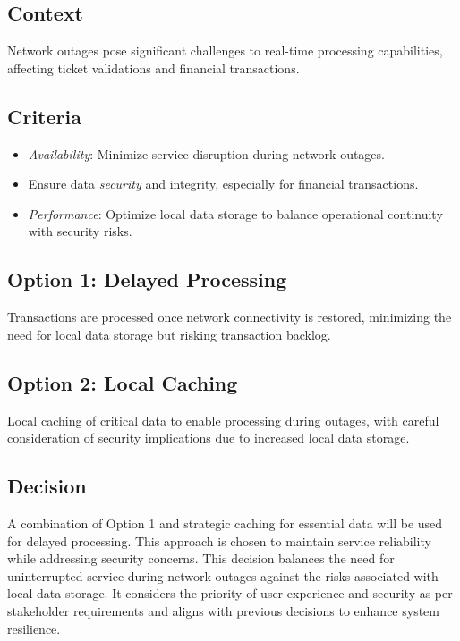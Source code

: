 \subsection*{Context}
Network outages pose significant challenges to real-time processing capabilities, affecting ticket validations and financial transactions.

\subsection*{Criteria}
\begin{itemize}
    \item \textit{Availability}: Minimize service disruption during network outages.
    \item Ensure data \textit{security} and integrity, especially for financial transactions.
    \item \textit{Performance}: Optimize local data storage to balance operational continuity with security risks.
\end{itemize}

\subsection*{Option 1: Delayed Processing}
Transactions are processed once network connectivity is restored, minimizing the need for local data storage but risking transaction backlog.

\subsection*{Option 2: Local Caching}
Local caching of critical data to enable processing during outages, with careful consideration of security implications due to increased local data storage.

\subsection*{Decision}
A combination of Option 1 and strategic caching for essential data will be used for delayed processing. This approach is chosen to maintain service reliability while addressing security concerns.
This decision balances the need for uninterrupted service during network outages against the risks associated with local data storage. It considers the priority of user experience and security as per stakeholder requirements and aligns with previous decisions to enhance system resilience.

